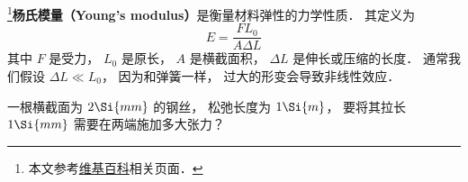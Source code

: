 
\begin{issues}
\issueDraft
\end{issues}

\footnote{本文参考\href{https://en.wikipedia.org/wiki/Young's_modulus}{维基百科}相关页面．}\textbf{杨氏模量（Young's modulus）}是衡量材料弹性的力学性质． 其定义为
\begin{equation}
E = \frac{FL_0}{A\Delta L}
\end{equation}
其中 $F$ 是受力， $L_0$ 是原长， $A$ 是横截面积， $\Delta L$ 是伸长或压缩的长度． 通常我们假设 $\Delta L \ll L_0$， 因为和弹簧一样， 过大的形变会导致非线性效应．

\begin{example}{}
一根横截面为 $2\Si{mm}$ 的钢丝， 松弛长度为 $1\Si{m}$， 要将其拉长 $1\Si{mm}$ 需要在两端施加多大张力？
\end{example}

